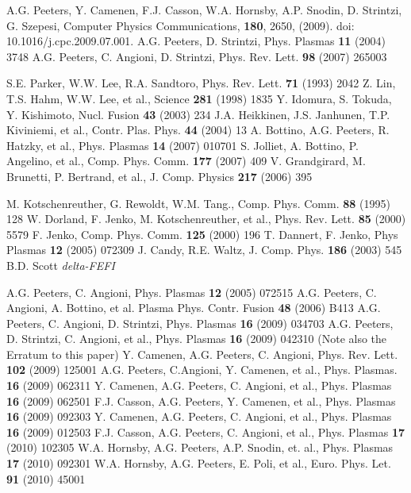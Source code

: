 \begin{thebibliography}{10}
 A.G. Peeters, Y. Camenen, F.J. Casson, W.A. Hornsby, A.P. Snodin, D. Strintzi, G. Szepesi,
Computer Physics Communications, {\bf 180}, 2650, (2009). doi: 10.1016/j.cpc.2009.07.001.
 A.G. Peeters, D. Strintzi, Phys. Plasmas {\bf 11} (2004) 3748 
 A.G. Peeters, C. Angioni, D. Strintzi, Phys. Rev. Lett. {\bf 98} (2007) 265003

 S.E. Parker, W.W. Lee, R.A. Sandtoro, Phys. Rev. Lett. {\bf 71} (1993) 2042 
 Z. Lin, T.S. Hahm, W.W. Lee, et al., Science {\bf 281} (1998) 1835
 Y. Idomura, S. Tokuda, Y. Kishimoto, Nucl. Fusion {\bf 43} (2003) 234  
 J.A. Heikkinen, J.S. Janhunen, T.P. Kiviniemi, et al., Contr. Plas. Phys. {\bf 44} (2004) 13
 A. Bottino, A.G. Peeters, R. Hatzky, et al., Phys. Plasmas {\bf 14} (2007) 010701 
 S. Jolliet, A. Bottino, P. Angelino, et al., Comp. Phys. Comm. {\bf 177} (2007) 409
 V. Grandgirard, M. Brunetti, P. Bertrand, et al., J. Comp. Physics {\bf 217} (2006) 395  

 M. Kotschenreuther, G. Rewoldt, W.M. Tang., Comp. Phys. Comm. {\bf 88} (1995) 128
 W. Dorland, F. Jenko, M. Kotschenreuther, et al., Phys. Rev. Lett. {\bf 85} (2000) 5579 
 F. Jenko, Comp. Phys. Comm. {\bf 125} (2000) 196  
 T. Dannert, F. Jenko, Phys Plasmas {\bf 12} (2005) 072309 
 J. Candy, R.E. Waltz, J. Comp. Phys. {\bf 186} (2003) 545 
 B.D. Scott {\sl delta-FEFI} 

 A.G. Peeters, C. Angioni, Phys. Plasmas {\bf 12} (2005) 072515   
 A.G. Peeters, C. Angioni, A. Bottino, et al. Plasma Phys. Contr. Fusion {\bf 48} (2006) B413 
 A.G. Peeters, C. Angioni, D. Strintzi, Phys. Plasmas {\bf 16} (2009) 034703
 A.G. Peeters, D. Strintzi, C. Angioni, et al., Phys. Plasmas {\bf 16} (2009) 042310 (Note also the Erratum to this paper) 
 Y. Camenen, A.G. Peeters, C. Angioni, Phys. Rev. Lett. {\bf 102} (2009) 125001  
 A.G. Peeters, C.Angioni, Y. Camenen, et al., Phys. Plasmas. {\bf 16} (2009) 062311
 Y. Camenen, A.G. Peeters, C. Angioni, et al., Phys. Plasmas {\bf 16} (2009) 062501  
 F.J. Casson, A.G. Peeters, Y. Camenen, et al., Phys. Plasmas {\bf 16} (2009) 092303
 Y. Camenen, A.G. Peeters, C. Angioni, et al., Phys. Plasmas {\bf 16} (2009) 012503
 F.J. Casson, A.G. Peeters, C. Angioni, et al., Phys. Plasmas {\bf 17} (2010) 102305 
 W.A. Hornsby, A.G. Peeters, A.P. Snodin, et. al., Phys. Plasmas {\bf 17} (2010) 092301 
 W.A. Hornsby, A.G. Peeters, E. Poli, et al., Euro. Phys. Let. {\bf 91} (2010) 45001 
 

\end{thebibliography}
